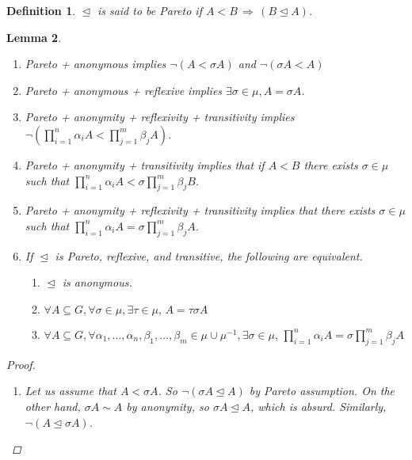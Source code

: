 \documentclass[11pt]{article}
\newtheorem{definition}{Definition}
\newtheorem{lemma}[definition]{Lemma}
\newcommand{\releq}{\mathrel{\trianglelefteq}}
\begin{document}
\begin{definition}
$\releq$ is said to be Pareto if $A < B \,\Rightarrow\,(B \releq A)$. 
\end{definition}



\begin{lemma}\label{lem:pareto}
\begin{enumerate}
 \item\label{lem:pareto1} Pareto + anonymous implies $\neg(A < \sigma A)$ and $\neg(\sigma A < A)$

  \item\label{lem:pareto2} Pareto + anonymous + reflexive implies $\exists \sigma \in \mu, A = \sigma A$.
 
 

 \item\label{lem:pareto3} Pareto + anonymity + reflexivity + transitivity implies $\neg(\prod_{i =1}^n \alpha_i A < \prod_{j =1}^m \beta_j A)$.
 
 
  \item\label{lem:pareto4} Pareto + anonymity + transitivity implies that if $A < B$ there exists $\sigma \in \mu$ such that $\prod_{i =1}^n \alpha_i A < \sigma \prod_{j =1}^m \beta_j B$.
 
 \item\label{lem:pareto5} Pareto + anonymity + reflexivity + transitivity implies that there exists $\sigma \in \mu$ such that $\prod_{i =1}^n \alpha_i A = \sigma \prod_{j =1}^m \beta_j A$.
 
 
 \item\label{lem:pareto6} If $\releq$ is Pareto, reflexive, and transitive, the following are equivalent.
  \begin{enumerate}
   \item $\releq$ is anonymous.
   
   \item $\forall A \subseteq G, \forall \sigma \in \mu, \exists \tau \in \mu, \, A = \tau \sigma A$ 
   
   \item $\forall A \subseteq G, \forall \alpha_1,\dots,\alpha_n,\beta_1,\dots, \beta_m \in \mu \cup \mu^{-1}, \exists \sigma \in \mu, \, \prod_{i =1}^n \alpha_i A = \sigma \prod_{j =1}^m \beta_j A$
  \end{enumerate}
\end{enumerate}

\begin{proof}
 \begin{enumerate}
  \item Let us assume that $A < \sigma A$. So $\neg ( \sigma A \releq A)$ by Pareto assumption. On the other hand, $\sigma A \sim A$ by anonymity, so $\sigma A \releq A$, which is absurd. Similarly, $\neg(A \releq \sigma A)$.
  

\end{enumerate}
\end{proof}
\end{lemma}
\end{document}
